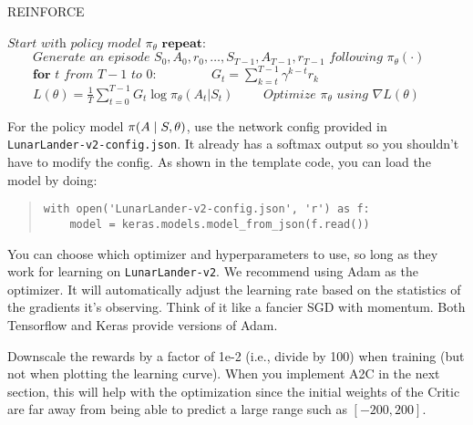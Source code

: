 \documentclass[12pt]{article}
\begin{document}

\begin{algorithm}
\caption{REINFORCE\label{REINFORCE}}
\begin{algorithmic}[1]
\State $\textit{Start with policy model } \pi_\theta $
\State $\textbf{repeat:}$
\State $\qquad\textit{Generate an episode } S_0, A_0, r_0, \ldots, S_{T-1}, A_{T-1}, r_{T-1} \textit{ following } \pi_\theta(\cdot)$
\State $\qquad\textbf{for } t \textit{ from } T-1 \textit{ to } 0$:
\State $\qquad\qquad G_t = \sum_{k=t}^{T-1} \gamma^{k-t} r_{k}$ 
\State $\qquad L(\theta) = \frac{1}{T} \sum_{t=0}^{T-1} G_t \log \pi_\theta(A_t | S_t)$
\State $\qquad\textit{Optimize } \pi_\theta \textit{ using } \nabla L(\theta)$
\EndProcedure
\end{algorithmic}
\end{algorithm}

For the policy model $\pi(A \mid S, \bf{\theta})$, use the network config provided in \\\texttt{LunarLander-v2-config.json}. It already has a softmax output so you shouldn't have to modify the config. As shown in the template code, you can load the model by doing:
\begin{quote}
\begin{verbatim}
with open('LunarLander-v2-config.json', 'r') as f:
    model = keras.models.model_from_json(f.read())
\end{verbatim}
\end{quote}
You can choose which optimizer and hyperparameters to use, so long as they work for learning on \texttt{LunarLander-v2}. We recommend using Adam as the optimizer. It will automatically adjust the learning rate based on the statistics of the gradients it's observing. Think of it like a fancier SGD with momentum. Both Tensorflow and Keras provide versions of Adam.

Downscale the rewards by a factor of 1e-2 (i.e., divide by 100) when training (but not when plotting the learning curve). When you implement A2C in the next section, this will help with the optimization since the initial weights of the Critic are far away from being able to predict a large range such as $[-200, 200]$.
\end{document}
